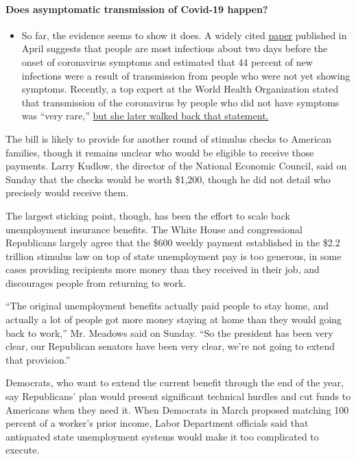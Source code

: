 \begin{itemize}
{  \paragraph{Does asymptomatic transmission of Covid-19
  happen?}\label{does-asymptomatic-transmission-of-covid-19-happen}}

  \begin{itemize}
  \tightlist
  \item
    So far, the evidence seems to show it does. A widely cited
    \href{https://www.nature.com/articles/s41591-020-0869-5}{paper}
    published in April suggests that people are most infectious about
    two days before the onset of coronavirus symptoms and estimated that
    44 percent of new infections were a result of transmission from
    people who were not yet showing symptoms. Recently, a top expert at
    the World Health Organization stated that transmission of the
    coronavirus by people who did not have symptoms was ``very rare,''
    \href{https://www.nytimes.com/2020/06/09/world/coronavirus-updates.html?action=click\&pgtype=Article\&state=default\&region=MAIN_CONTENT_3\&context=storylines_faq\#link-1f302e21}{but
    she later walked back that statement.}
  \end{itemize}
\end{itemize}

The bill is likely to provide for another round of stimulus checks to
American families, though it remains unclear who would be eligible to
receive those payments. Larry Kudlow, the director of the National
Economic Council, said on Sunday that the checks would be worth \$1,200,
though he did not detail who precisely would receive them.

The largest sticking point, though, has been the effort to scale back
unemployment insurance benefits. The White House and congressional
Republicans largely agree that the \$600 weekly payment established in
the \$2.2 trillion stimulus law on top of state unemployment pay is too
generous, in some cases providing recipients more money than they
received in their job, and discourages people from returning to work.

``The original unemployment benefits actually paid people to stay home,
and actually a lot of people got more money staying at home than they
would going back to work,'' Mr. Meadows said on Sunday. ``So the
president has been very clear, our Republican senators have been very
clear, we're not going to extend that provision.''

Democrats, who want to extend the current benefit through the end of the
year, say Republicans' plan would present significant technical hurdles
and cut funds to Americans when they need it. When Democrats in March
proposed matching 100 percent of a worker's prior income, Labor
Department officials said that antiquated state unemployment systems
would make it too complicated to execute.

